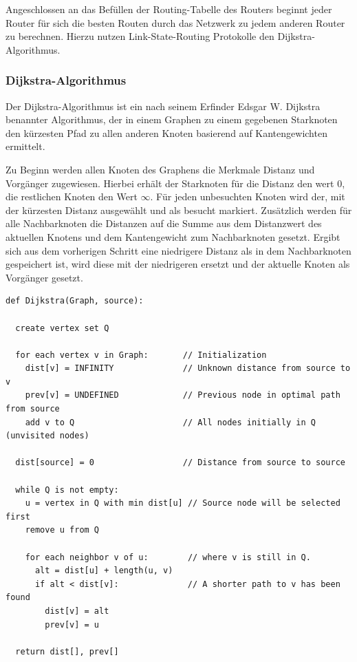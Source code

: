 \documentclass[1pt,a4paper,final]{article}
\begin{document}
Angeschlossen an das Befüllen der Routing-Tabelle des Routers beginnt jeder Router für sich die besten Routen durch das Netzwerk zu jedem anderen Router zu berechnen.
Hierzu nutzen Link-State-Routing Protokolle den Dijkstra-Algorithmus.
\subsubsection{Dijkstra-Algorithmus}
Der Dijkstra-Algorithmus ist ein nach seinem Erfinder Edsgar W. Dijkstra benannter Algorithmus, der in einem Graphen zu einem gegebenen Starknoten den kürzesten Pfad zu allen anderen Knoten basierend auf Kantengewichten ermittelt.

Zu Beginn werden allen Knoten des Graphens die Merkmale Distanz und Vorgänger zugewiesen. Hierbei erhält der Starknoten für die Distanz den wert $0$, die restlichen Knoten den Wert $\infty$.
Für jeden unbesuchten Knoten wird der, mit der kürzesten Distanz ausgewählt und als besucht markiert.
Zusätzlich werden für alle Nachbarknoten die Distanzen auf die Summe aus dem Distanzwert des aktuellen Knotens und dem Kantengewicht zum Nachbarknoten gesetzt.
Ergibt sich aus dem vorherigen Schritt eine niedrigere Distanz als in dem Nachbarknoten gespeichert ist, wird diese mit der niedrigeren ersetzt und der aktuelle Knoten als Vorgänger gesetzt.\\
\begin{verbatim}
def Dijkstra(Graph, source):

  create vertex set Q
  
  for each vertex v in Graph:       // Initialization
    dist[v] = INFINITY              // Unknown distance from source to v
    prev[v] = UNDEFINED             // Previous node in optimal path from source
    add v to Q                      // All nodes initially in Q (unvisited nodes)

  dist[source] = 0                  // Distance from source to source      

  while Q is not empty:
    u = vertex in Q with min dist[u] // Source node will be selected first
    remove u from Q 

    for each neighbor v of u:        // where v is still in Q.
      alt = dist[u] + length(u, v)
      if alt < dist[v]:              // A shorter path to v has been found
        dist[v] = alt 
        prev[v] = u 
        
  return dist[], prev[]
\end{verbatim}
\end{document}
